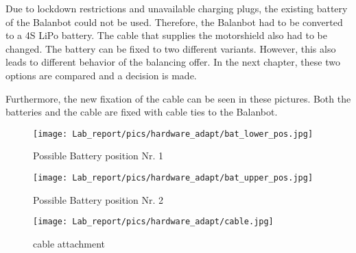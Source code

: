 Due to lockdown restrictions and unavailable charging plugs, the existing battery of the Balanbot could not be used. Therefore, the Balanbot had to be converted to a 4S LiPo battery. The cable that supplies the motorshield also had to be changed. The battery can be fixed to two different variants. However, this also leads to different behavior of the balancing offer. In the next chapter, these two options are compared and a decision is made.

Furthermore, the new fixation of the cable can be seen in these pictures. Both the batteries and the cable are fixed with cable ties to the Balanbot.
\begin{figure}[H]
    \centering
    \texttt{[image: Lab\_report/pics/hardware\_adapt/bat\_lower\_pos.jpg]}
    \caption{Possible Battery position Nr. 1}
    \label{fig:lower_bat_pos}
\end{figure}

\begin{figure}[H]
    \centering
    \texttt{[image: Lab\_report/pics/hardware\_adapt/bat\_upper\_pos.jpg]}
    \caption{Possible Battery position Nr. 2 }
    \label{fig:upperlower_bat_pos}
\end{figure}

\begin{figure}[H]
    \centering
    \texttt{[image: Lab\_report/pics/hardware\_adapt/cable.jpg]}
    \caption{cable attachment}
    \label{fig:cable}
\end{figure}

